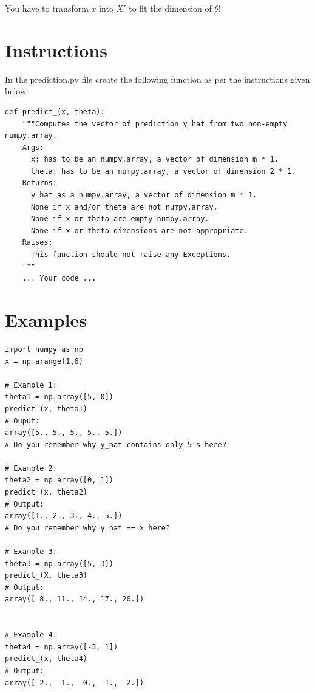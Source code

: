 \documentclass{42-en}
\begin{document}

You have to transform $x$ into $X'$ to fit the dimension of $\theta$!


\section*{Instructions}
In the prediction.py file create the following function as per the instructions given below:

\begin{verbatim}
def predict_(x, theta):
    """Computes the vector of prediction y_hat from two non-empty numpy.array.
    Args:
      x: has to be an numpy.array, a vector of dimension m * 1.
      theta: has to be an numpy.array, a vector of dimension 2 * 1.
    Returns:
      y_hat as a numpy.array, a vector of dimension m * 1.
      None if x and/or theta are not numpy.array.
      None if x or theta are empty numpy.array.
      None if x or theta dimensions are not appropriate.
    Raises:
      This function should not raise any Exceptions.
    """
    ... Your code ...
\end{verbatim}

\section*{Examples}
\begin{verbatim}
import numpy as np
x = np.arange(1,6)

# Example 1:
theta1 = np.array([5, 0])
predict_(x, theta1)
# Ouput:
array([5., 5., 5., 5., 5.])
# Do you remember why y_hat contains only 5's here?

# Example 2:
theta2 = np.array([0, 1])
predict_(x, theta2)
# Output:
array([1., 2., 3., 4., 5.])
# Do you remember why y_hat == x here?

# Example 3:
theta3 = np.array([5, 3])
predict_(X, theta3)
# Output:
array([ 8., 11., 14., 17., 20.])


# Example 4:
theta4 = np.array([-3, 1])
predict_(x, theta4)
# Output:
array([-2., -1.,  0.,  1.,  2.])
\end{verbatim}
\end{document}
